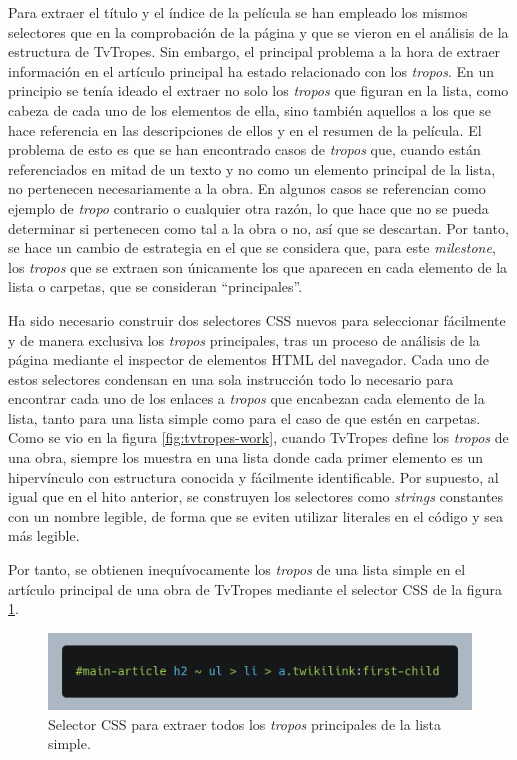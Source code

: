 Para extraer el título y el índice de la película se han empleado los mismos
selectores que en la comprobación de la página y que se vieron en el análisis de
la estructura de TvTropes. Sin embargo, el principal problema a la hora de
extraer información en el artículo principal ha estado relacionado con los
\textit{tropos}. En un principio se tenía ideado el extraer no solo los
\textit{tropos} que figuran en la lista, como cabeza de cada uno de los
elementos de ella, sino también aquellos a los que se hace referencia en las
descripciones de ellos y en el resumen de la película. El problema de esto es
que se han encontrado casos de \textit{tropos} que, cuando están referenciados
en mitad de un texto y no como un elemento principal de la lista, no pertenecen
necesariamente a la obra. En algunos casos se referencian como ejemplo de
\textit{tropo} contrario o cualquier otra razón, lo que hace que no se pueda
determinar si pertenecen como tal a la obra o no, así que se descartan. Por
tanto, se hace un cambio de estrategia en el que se considera que, para este
\textit{milestone}, los \textit{tropos} que se extraen son únicamente los que
aparecen en cada elemento de la lista o carpetas, que se consideran
``principales''.

Ha sido necesario construir dos selectores CSS nuevos para seleccionar
fácilmente y de manera exclusiva los \textit{tropos} principales, tras un
proceso de análisis de la página mediante el inspector de elementos HTML del
navegador. Cada uno de estos selectores condensan en una sola instrucción todo
lo necesario para encontrar cada uno de los enlaces a \textit{tropos} que
encabezan cada elemento de la lista, tanto para una lista simple como para el
caso de que estén en carpetas. Como se vio en la figura \ref{fig:tvtropes-work},
cuando TvTropes define los \textit{tropos} de una obra, siempre los muestra en
una lista donde cada primer elemento es un hipervínculo con estructura conocida
y fácilmente identificable. Por supuesto, al igual que en el hito anterior, se
construyen los selectores como \textit{strings} constantes con un nombre
legible, de forma que se eviten utilizar literales en el código y sea más
legible.

Por tanto, se obtienen inequívocamente los \textit{tropos} de una lista simple
en el artículo principal de una obra de TvTropes mediante el selector CSS de la
figura \ref{fig:selector-lista}.

\begin{figure}[ht]
    \includegraphics[width=\textwidth]{img/selector-tropes.png}
    \caption{Selector CSS para extraer todos los \textit{tropos} principales de
    la lista simple.}
    \label{fig:selector-lista}
\end{figure}

